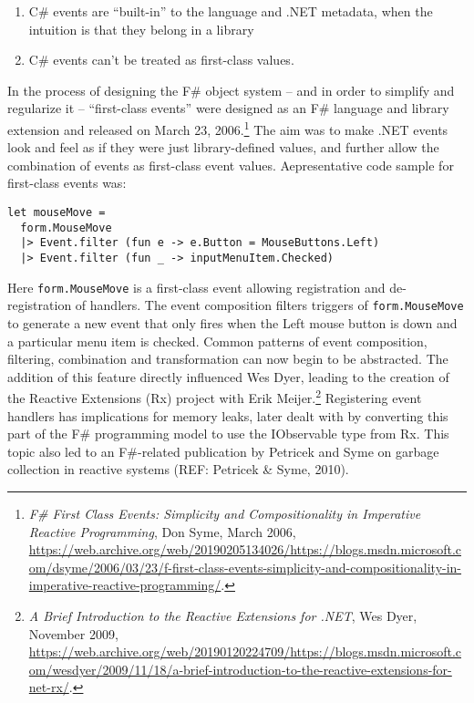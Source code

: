 \documentclass[acmsmall,review]{acmart}\settopmatter{printfolios=true,printccs=false,printacmref=false}
\begin{document}
\begin{enumerate}
\item C\# events are “built-in” to the language and .NET metadata, when the intuition is that they belong in a library
\item C\# events can’t be treated as first-class values.  
\end{enumerate}

In the process of designing the F\# object system – and in order to simplify and regularize it – “first-class events” were designed as an F\# language and library extension and released on March 23, 2006.\footnote{\textit{F\# First Class Events: Simplicity and Compositionality in Imperative Reactive Programming}, Don Syme, March 2006,  \url{https://web.archive.org/web/20190205134026/https://blogs.msdn.microsoft.com/dsyme/2006/03/23/f-first-class-events-simplicity-and-compositionality-in-imperative-reactive-programming/}.}  The aim was to make .NET events look and feel as if they were just library-defined values, and further allow the combination of events as first-class event values. Aepresentative code sample for first-class events was:

\begin{verbatim}
let mouseMove = 
  form.MouseMove 
  |> Event.filter (fun e -> e.Button = MouseButtons.Left)
  |> Event.filter (fun _ -> inputMenuItem.Checked)
\end{verbatim}

Here \texttt{form.MouseMove} is a first-class event allowing registration and de-registration of handlers.  The event composition filters triggers of \texttt{form.MouseMove} to generate a new event that only fires when the Left mouse button is down and a particular menu item is checked.  Common patterns of event composition, filtering, combination and transformation can now begin to be abstracted.  The addition of this feature directly influenced Wes Dyer, leading to the creation of the Reactive Extensions (Rx) project with Erik Meijer.\footnote{\textit{A Brief Introduction to the Reactive Extensions for .NET}, Wes Dyer, November 2009, \url{https://web.archive.org/web/20190120224709/https://blogs.msdn.microsoft.com/wesdyer/2009/11/18/a-brief-introduction-to-the-reactive-extensions-for-net-rx/}.}  Registering event handlers has implications for memory leaks, later dealt with by converting this part of the F\# programming model to use the IObservable type from Rx.  This topic also led to an F\#-related publication by Petricek and Syme on garbage collection in reactive systems (REF: Petricek \& Syme, 2010).
\end{document}

